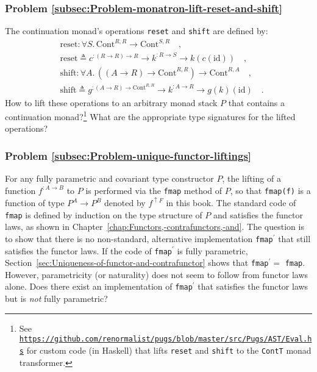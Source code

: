\subsubsection{Problem \label{subsec:Problem-monatron-lift-reset-and-shift}\ref{subsec:Problem-monatron-lift-reset-and-shift}}

The continuation monad\textsf{'}s operations \lstinline!reset! and \lstinline!shift!
are defined by:
\begin{align*}
 & \text{reset}:\forall S.\,\text{Cont}^{R,R}\rightarrow\text{Cont}^{S,R}\quad,\\
 & \text{reset}\triangleq c^{:\left(R\rightarrow R\right)\rightarrow R}\rightarrow k^{:R\rightarrow S}\rightarrow k(c(\text{id}))\quad,\\
 & \text{shift}:\forall A.\,((A\rightarrow R)\rightarrow\text{Cont}^{R,R})\rightarrow\text{Cont}^{R,A}\quad,\\
 & \text{shift}\triangleq g^{:\left(A\rightarrow R\right)\rightarrow\text{Cont}^{R,R}}\rightarrow k^{:A\rightarrow R}\rightarrow g(k)(\text{id})\quad.
\end{align*}
How to lift these operations to an arbitrary monad stack $P$ that
contains a continuation monad?\footnote{See \texttt{\href{https://github.com/renormalist/pugs/blob/master/src/Pugs/AST/Eval.hs}{https://github.com/renormalist/pugs/blob/master/src/Pugs/AST/Eval.hs}}
for custom code (in Haskell) that lifts \lstinline!reset! and \lstinline!shift!
to the \lstinline!ContT! monad transformer.} What are the appropriate type signatures for the lifted operations?

\subsubsection{Problem \label{subsec:Problem-unique-functor-liftings}\ref{subsec:Problem-unique-functor-liftings}}

For any fully parametric and covariant type constructor $P$, the
lifting of a function $f^{:A\rightarrow B}$ to $P$ is performed
via the \lstinline!fmap! method of $P$, so that \lstinline!fmap(f)!
is a function of type $P^{A}\rightarrow P^{B}$ denoted by $f^{\uparrow F}$
in this book. The standard code of \lstinline!fmap! is defined by
induction on the type structure of $P$ and satisfies the functor
laws, as shown in Chapter~\ref{chap:Functors,-contrafunctors,-and}.
The question is to show that there is no non-standard, alternative
implementation \lstinline!fmap!$^{\prime}$ that still satisfies
the functor laws. If the code of \lstinline!fmap!$^{\prime}$ is
fully parametric, Section~\ref{sec:Uniqueness-of-functor-and-contrafunctor}
shows that \lstinline!fmap!$^{\prime}=$ \lstinline!fmap!. However,
parametricity (or naturality) does not seem to follow from functor
laws alone. Does there exist an implementation of \lstinline!fmap!$^{\prime}$
that satisfies the functor laws but is \emph{not} fully parametric?

